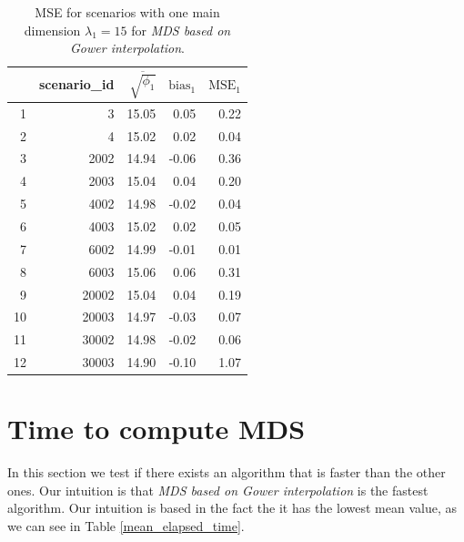 \documentclass[11pt]{report}
\begin{document}
\begin{table}[ht]
\centering
\begin{tabular}{rrrrr}
 & scenario\_id & $\overline{\sqrt{\phi_1}}$ & $\mbox{bias}_1$ & $\mbox{MSE}_1$ \\
  \hline
  1 & 3 & 15.05 & 0.05 & 0.22 \\ 
  2 & 4 & 15.02 & 0.02 & 0.04 \\ 
  3 & 2002 & 14.94 & -0.06 & 0.36 \\ 
  4 & 2003 & 15.04 & 0.04 & 0.20 \\ 
  5 & 4002 & 14.98 & -0.02 & 0.04 \\ 
  6 & 4003 & 15.02 & 0.02 & 0.05 \\ 
  7 & 6002 & 14.99 & -0.01 & 0.01 \\ 
  8 & 6003 & 15.06 & 0.06 & 0.31 \\ 
  9 & 20002 & 15.04 & 0.04 & 0.19 \\ 
  10 & 20003 & 14.97 & -0.03 & 0.07 \\ 
  11 & 30002 & 14.98 & -0.02 & 0.06 \\ 
  12 & 30003 & 14.90 & -0.10 & 1.07 \\ 
   \hline
\end{tabular}
\caption{MSE for scenarios with one main dimension $\lambda_1 = 15$ for \textit{MDS based on Gower interpolation}.}
\label{mse_gower_one_dimensions}
\end{table}



\section{Time to compute MDS}
In this section we test if there exists an algorithm that is faster than the
other ones. Our intuition is that \textit{MDS based on Gower interpolation} is
the fastest algorithm. Our intuition is based in the fact the it has the lowest
mean value, as we can see in Table \ref{mean_elapsed_time}.
\end{document}
